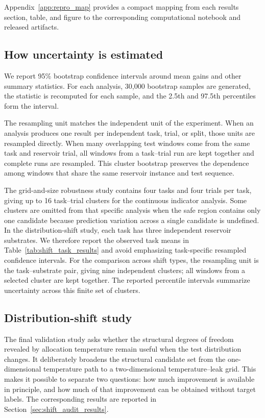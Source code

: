 \documentclass[11pt,a4paper]{article}
\begin{document}
Appendix~\ref{app:repro_map} provides a compact mapping from each results section, table, and figure to the corresponding computational notebook and released artifacts.

\subsection{How uncertainty is estimated}
\label{sec:uncertainty_methods}

We report 95\% bootstrap confidence intervals around mean gains and other summary statistics. For each analysis, 30,000 bootstrap samples are generated, the statistic is recomputed for each sample, and the 2.5th and 97.5th percentiles form the interval.

The resampling unit matches the independent unit of the experiment. When an analysis produces one result per independent task, trial, or split, those units are resampled directly. When many overlapping test windows come from the same task and reservoir trial, all windows from a task--trial run are kept together and complete runs are resampled. This cluster bootstrap preserves the dependence among windows that share the same reservoir instance and test sequence.

The grid-and-size robustness study contains four tasks and four trials per task, giving up to 16 task--trial clusters for the continuous indicator analysis. Some clusters are omitted from that specific analysis when the safe region contains only one candidate because prediction variation across a single candidate is undefined. In the distribution-shift study, each task has three independent reservoir substrates. We therefore report the observed task means in Table~\ref{tab:shift_task_results} and avoid emphasizing task-specific resampled confidence intervals. For the comparison across shift types, the resampling unit is the task--substrate pair, giving nine independent clusters; all windows from a selected cluster are kept together. The reported percentile intervals summarize uncertainty across this finite set of clusters.

\subsection{Distribution-shift study}
\label{sec:shift_audit_methods}

The final validation study asks whether the structural degrees of freedom revealed by allocation temperature remain useful when the test distribution changes. It deliberately broadens the structural candidate set from the one-dimensional temperature path to a two-dimensional temperature--leak grid. This makes it possible to separate two questions: how much improvement is available in principle, and how much of that improvement can be obtained without target labels. The corresponding results are reported in Section~\ref{sec:shift_audit_results}.
\end{document}
